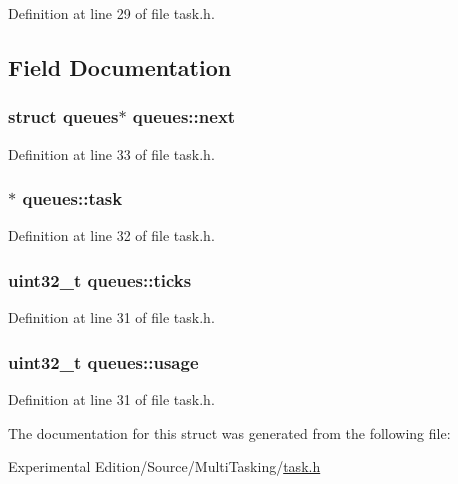 Definition at line 29 of file task.\+h.



\subsection{Field Documentation}
\subsubsection[{\texorpdfstring{next}{next}}]{\setlength{\rightskip}{0pt plus 5cm}struct {\bf queues}$\ast$ queues\+::next}\hypertarget{structqueues_a9138274fd7864a17d10f7700c2e603d2}{}\label{structqueues_a9138274fd7864a17d10f7700c2e603d2}


Definition at line 33 of file task.\+h.

\subsubsection[{\texorpdfstring{task}{task}}]{$\ast$ queues\+::task}\hypertarget{structqueues_ad14ef75e56140d0ae658ea2d38d5bb26}{}\label{structqueues_ad14ef75e56140d0ae658ea2d38d5bb26}


Definition at line 32 of file task.\+h.

\subsubsection[{\texorpdfstring{ticks}{ticks}}]{\setlength{\rightskip}{0pt plus 5cm}uint32\+\_\+t queues\+::ticks}\hypertarget{structqueues_ab951f1f175f248912a793fc7dac10e5d}{}\label{structqueues_ab951f1f175f248912a793fc7dac10e5d}


Definition at line 31 of file task.\+h.

\subsubsection[{\texorpdfstring{usage}{usage}}]{\setlength{\rightskip}{0pt plus 5cm}uint32\+\_\+t queues\+::usage}\hypertarget{structqueues_abcded8e97b078ab04228a84686c301a6}{}\label{structqueues_abcded8e97b078ab04228a84686c301a6}


Definition at line 31 of file task.\+h.



The documentation for this struct was generated from the following file\+:\begin{DoxyCompactItemize}
\item 
Experimental Edition/\+Source/\+Multi\+Tasking/\hyperlink{task_8h}{task.\+h}\end{DoxyCompactItemize}
